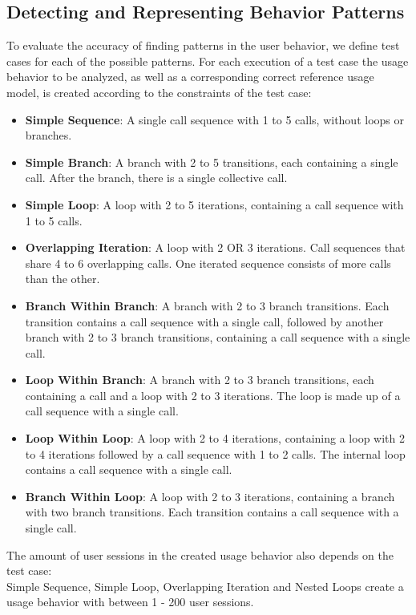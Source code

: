\documentclass[10pt,a4paper]{article}
\begin{document}
	\subsection{Detecting and Representing Behavior Patterns}
	To evaluate the accuracy of finding patterns in the user behavior, we define test cases for each of the possible patterns. For each execution of a test case the usage behavior to be analyzed, as well as a corresponding correct reference usage model, is created according to the constraints of the test case:
	\begin{itemize}
		\item \textbf{Simple Sequence}: A single call sequence with 1 to 5 calls, without loops or branches.
		\item \textbf{Simple Branch}: A branch with 2 to 5 transitions, each containing a single call. After the branch, there is a single collective call.
		\item \textbf{Simple Loop}: A loop with 2 to 5 iterations, containing a call sequence with 1 to 5 calls.
		\item \textbf{Overlapping Iteration}: A loop with 2 OR 3 iterations. Call sequences that share 4 to 6 overlapping calls. One iterated sequence consists of more calls than the other.
		\item \textbf{Branch Within Branch}: A branch with 2 to 3 branch transitions. Each transition contains a call sequence with a single call, followed by another branch with 2 to 3 branch transitions, containing a call sequence with a single call.
		\item \textbf{Loop Within Branch}: A branch with 2 to 3 branch transitions, each containing a call and a loop with 2 to 3 iterations. The loop is made up of a call sequence with a single call.
		\item \textbf{Loop Within Loop}: A loop with 2 to 4 iterations, containing a loop with 2 to 4 iterations followed by a call sequence with 1 to 2 calls. The internal loop contains a call sequence with a single call.
		\item \textbf{Branch Within Loop}: A loop with 2 to 3 iterations, containing a branch with two branch transitions. Each transition contains a call sequence with a single call.
	\end{itemize}
	The amount of user sessions in the created usage behavior also depends on the test case:\\
	Simple Sequence, Simple Loop, Overlapping Iteration and Nested Loops create a usage behavior with between 1 - 200 user sessions.\\
\end{document}
